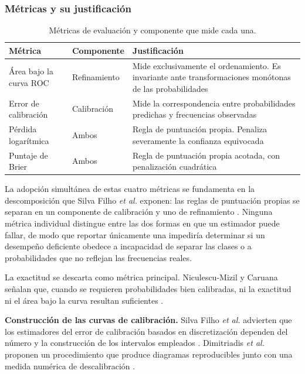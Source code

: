 \subsubsection{Métricas y su justificación}

\begin{table}[!t]
\centering
\caption{Métricas de evaluación y componente que mide cada una.}
\label{tab:metricas}
\footnotesize
\begin{tabularx}{\columnwidth}{@{}P{2.1cm} P{1.9cm} Y@{}}
\toprule
\textbf{Métrica} & \textbf{Componente} &
\textbf{Justificación}\\
\midrule
Área bajo la curva ROC & Refinamiento &
Mide exclusivamente el ordenamiento. Es invariante ante transformaciones
monótonas de las probabilidades\\
Error de calibración & Calibración &
Mide la correspondencia entre probabilidades predichas y frecuencias
observadas\\
Pérdida logarítmica & Ambos &
Regla de puntuación propia. Penaliza severamente la confianza equivocada\\
Puntaje de Brier & Ambos &
Regla de puntuación propia acotada, con penalización cuadrática\\
\bottomrule
\end{tabularx}
\end{table}

La adopción simultánea de estas cuatro métricas se fundamenta en la
descomposición que Silva Filho \textit{et al.} exponen: las reglas de
puntuación propias se separan en un componente de calibración y uno de
refinamiento \cite{silvafilho_calibration_2023}. Ninguna métrica
individual distingue entre las dos formas en que un estimador puede
fallar, de modo que reportar únicamente una impediría determinar si un
desempeño deficiente obedece a incapacidad de separar las clases o a
probabilidades que no reflejan las frecuencias reales.

La exactitud se descarta como métrica principal. Niculescu-Mizil y Caruana
señalan que, cuando se requieren probabilidades bien calibradas, ni la
exactitud ni el área bajo la curva resultan suficientes
\cite{niculescumizil_probabilities_2005}.


\noindent\textbf{Construcción de las curvas de calibración.} Silva Filho
\textit{et al.} advierten que los estimadores del error de calibración
basados en discretización dependen del número y la construcción de los
intervalos empleados \cite{silvafilho_calibration_2023}. Dimitriadis
\textit{et al.} proponen un procedimiento que produce diagramas
reproducibles junto con una medida numérica de descalibración
\cite{dimitriadis_reliability_2021}.

